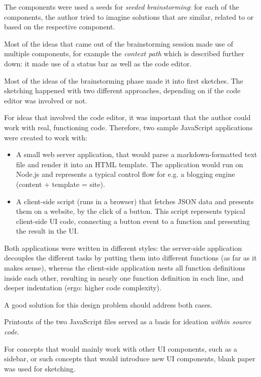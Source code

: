 The components were used a seeds for \emph{seeded brainstorming}: for
each of the components, the author tried to imagine solutions that are
similar, related to or based on the respective component.

Most of the ideas that came out of the brainstorming session made use of
multiple components, for example the \emph{context path} which is
described further down: it made use of a status bar as well as the code
editor.

Most of the ideas of the brainstorming phase made it into first
sketches. The sketching happened with two different approaches,
depending on if the code editor was involved or not.

For ideas that involved the code editor, it was important that the
author could work with real, functioning code. Therefore, two sample
JavaScript applications were created to work with:

\begin{itemize}
\itemsep1pt\parskip0pt
\item
  A small web server application, that would parse a markdown-formatted
  text file and render it into an HTML template. The application would
  run on Node.js and represents a typical control flow for e.g. a
  blogging engine (content + template = site).
\item
  A client-side script (runs in a browser) that fetches JSON data and
  presents them on a website, by the click of a button. This script
  represents typical client-side UI code, connecting a button event to a
  function and presenting the result in the UI.
\end{itemize}

Both applications were written in different styles: the server-side
application decouples the different tasks by putting them into different
functions (as far as it makes sense), whereas the client-side
application nests all function definitions inside each other, resulting
in nearly one function definition in each line, and deeper indentation
(ergo: higher code complexity).

A good solution for this design problem should address both cases.

Printouts of the two JavaScript files served as a basis for ideation
\emph{within source code}.

For concepts that would mainly work with other UI components, such as a
sidebar, or such concepts that would introduce new UI components, blank
paper was used for sketching.

